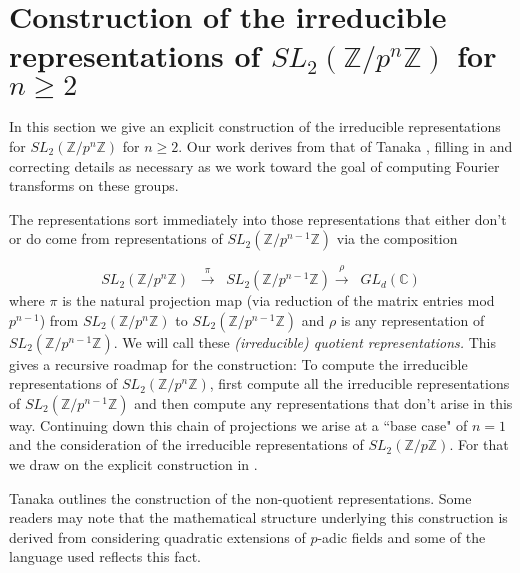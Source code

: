 \documentclass[12pt,reqno]{amsart}
\theoremstyle{remark}
\numberwithin{table}{section}
\newcommand{\C}{\mathbb C}
\newcommand{\Z}{\mathbb Z}
\begin{document}
\section{Construction of the irreducible representations of $SL_2(\Z/p^n \Z)$ for $n \geq 2$}

In this section we give an explicit construction of the irreducible representations for $SL_2(\Z/p^n \Z)$ for $n \geq 2$. Our work derives from that of Tanaka  \cite{Tanaka67-1},  filling in and correcting details as necessary as we work toward the goal of computing Fourier transforms on these groups. 

The representations sort immediately into those representations that either don't or do come from representations of $SL_2(\Z/p^{n-1} \Z)$ via the composition

\begin{equation}\label{eq:proj}
SL_2(\Z/p^n \Z) \;\; {\overset{\pi }{ \longrightarrow}} \;\; SL_2(\Z/p^{n-1} \Z) {\overset{\rho }{ \longrightarrow}}  \;\; GL_d(\C)
\end{equation}
where $\pi$ is the natural projection map (via reduction of the matrix entries mod $p^{n-1}$) from $SL_2(\Z/p^n \Z)$ to $ SL_2(\Z/p^{n-1} \Z) $ and $\rho$ is any representation of $SL_2(\Z /p^{n-1} \Z)$. We will call these {\em (irreducible) quotient representations.} This gives a recursive roadmap for the construction: To compute the irreducible representations of  $SL_2(\Z/p^n \Z)$, first compute all the irreducible representations of $SL_2(\Z/p^{n-1} \Z)$ and then compute any representations that don't arise in this way. Continuing down this chain of projections we arise at a ``base case" of $n=1$ and the consideration of the irreducible representations of $SL_2(\Z/p \Z)$. For that we draw on the explicit construction in \cite{LR92}
.

Tanaka  \cite{Tanaka67-1} outlines the construction of the non-quotient representations.  
Some readers may note that the mathematical structure underlying this construction is derived from considering quadratic extensions of $p$-adic fields and some of the language used reflects this fact.
 
\end{document}
